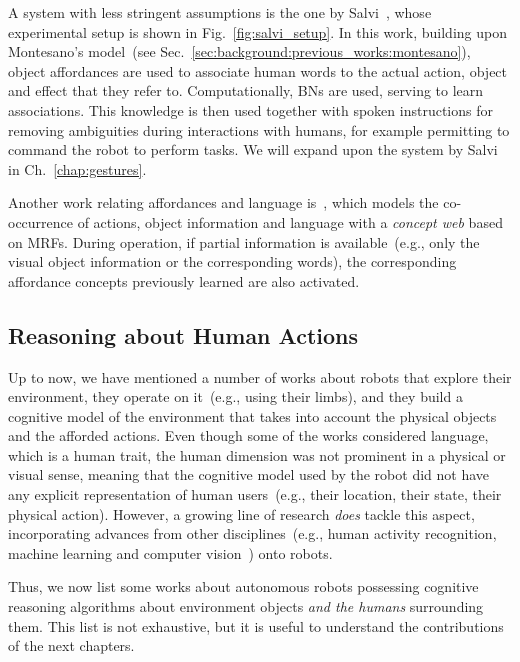A system with less stringent assumptions is the one by Salvi~\cite{salvi:2012:smcb}, whose experimental setup is shown in Fig.~\ref{fig:salvi_setup}.
In this work, building upon Montesano's model~(see Sec.~\ref{sec:background:previous_works:montesano}), object affordances are used to associate human words to the actual action, object and effect that they refer to.
Computationally, \acp{BN} are used, serving to learn \wordsmeanings{} associations.
This knowledge is then used together with spoken instructions for removing ambiguities during interactions with humans, for example permitting to command the robot to perform tasks.
We will expand upon the system by Salvi in Ch.~\ref{chap:gestures}.

Another work relating affordances and language is~\cite{celikkanat:2015:tamd}, which models the co-occurrence of actions, object information and language with a \emph{concept web} based on \acp{MRF}.
During operation, if partial information is available~(e.g., only the visual object information or the corresponding words), the corresponding affordance concepts previously learned are also activated.

\subsection{Reasoning about Human Actions}
\label{sec:background:previous_works:reasoning_about_human_actions}

Up to now, we have mentioned a number of works about robots that explore their environment, they operate on it~(e.g., using their limbs), and they build a cognitive model of the environment that takes into account the physical objects and the afforded actions.
Even though some of the works considered language, which is a human trait, the human dimension was not prominent in a physical or visual sense, meaning that the cognitive model used by the robot did not have any explicit representation of human users~(e.g., their location, their state, their physical action).
However, a growing line of research \emph{does} tackle this aspect, incorporating advances from other disciplines~(e.g., human activity recognition, machine learning and computer vision~\cite{aggarwal:2011}) onto robots.

Thus, we now list some works about autonomous robots possessing cognitive reasoning algorithms about environment objects \emph{and the humans} surrounding them.
This list is not exhaustive, but it is useful to understand the contributions of the next chapters.

